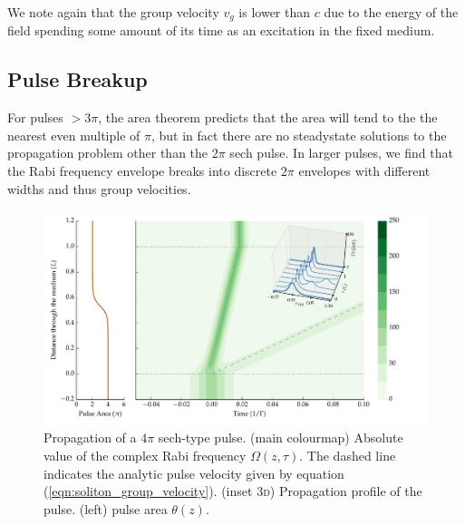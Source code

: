     We note again that the group velocity $v_g$ is lower than $c$ due to the
    energy of the field spending some amount of its time as an excitation in the
    fixed medium.

  \subsection{Pulse Breakup} 

    For pulses $>3 \pi$, the area theorem predicts that the area will tend to
    the the nearest even multiple of $\pi$, but in fact there are no steadystate
    solutions to the propagation problem other than the $2\pi$ sech
    pulse\cite{Matulic1972}. In larger pulses, we find that the Rabi frequency
    envelope breaks into discrete $2\pi$ envelopes with different widths and
    thus group velocities\cite{Lamb1971}.

    \begin{figure}[]
      \includegraphics[width=\linewidth]
        {figs/03_nonlinear/coh_sech_4_0pi_fwhm0_020_Ng01000_fig5.pdf}
      \caption{
      Propagation of a $4 \pi$ sech-type pulse. (main colourmap) Absolute value
      of the complex Rabi frequency $\Omega(z, \tau)$. The dashed line indicates
      the analytic pulse velocity given by equation
      (\ref{eqn:soliton_group_velocity}). (inset \textsc{3d}) Propagation
      profile of the pulse. (left) pulse area $\theta(z)$.
      }
      \label{fig:sit_4pi}
    \end{figure}

